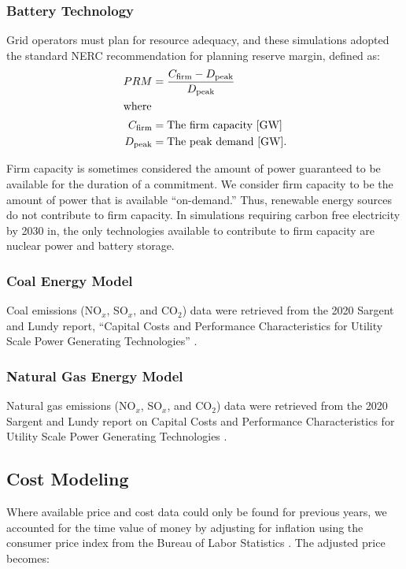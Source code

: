 \subsubsection{Battery Technology}

Grid operators must plan for resource adequacy, and these simulations adopted the standard \gls{NERC} recommendation for planning reserve margin, defined as: 
\begin{align}
         PRM &= \frac{ C_{\text{firm}} - D_{\text{peak}} }{ D_{\text{peak}} }\\
        \intertext{where}
        C_{\text{firm}} &= \text{The firm capacity  [GW]}\nonumber\\
        D_{\text{peak}} &= \text{The peak demand  [GW]}.\nonumber
\end{align}

Firm capacity is sometimes considered the amount of power guaranteed to be
available for the duration of a commitment. We consider firm capacity to be the
amount of power that is available ``on-demand.'' Thus, renewable energy sources
do not contribute to firm capacity. In simulations requiring carbon free
electricity by 2030 in, the only technologies available to contribute to firm
capacity are nuclear power and battery storage. 

\subsubsection{Coal Energy Model}
Coal emissions (NO$_x$, SO$_x$, and CO$_2$) data were retrieved from the 2020 
Sargent and Lundy report, ``Capital Costs and Performance Characteristics for 
Utility Scale Power Generating Technologies'' \cite{sargent__lundy_capital_2020}.

\subsubsection{Natural Gas Energy Model}
Natural gas emissions (NO$_x$, SO$_x$, and CO$_2$) data were retrieved from the 
2020 Sargent and Lundy report on Capital Costs and Performance Characteristics 
for Utility Scale Power Generating Technologies 
\cite{sargent__lundy_capital_2020}.


\subsection{Cost Modeling}

Where available price and cost data could only be found for previous years, we
                accounted for the time value of money by adjusting for
                inflation using the consumer price index from the
                Bureau of Labor Statistics \cite{bls_consumer_2021}. The
                adjusted price becomes:


